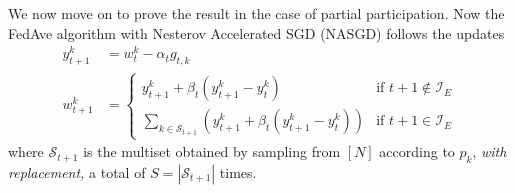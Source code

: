 %
We now move on to prove the result in the case of partial participation.
Now the FedAve algorithm with Nesterov Accelerated SGD (NASGD) follows
the updates
\begin{align*}
y_{t+1}^{k} & =w_{t}^{k}-\alpha_{t}g_{t,k}\\
w_{t+1}^{k} & =\begin{cases}
y_{t+1}^{k}+\beta_{t}(y_{t+1}^{k}-y_{t}^{k}) & \text{if }t+1\notin\mathcal{I}_{E}\\
\sum_{k\in\mathcal{S}_{t+1}}\left(y_{t+1}^{k}+\beta_{t}(y_{t+1}^{k}-y_{t}^{k})\right) & \text{if }t+1\in\mathcal{I}_{E}
\end{cases}
\end{align*}
where $\mathcal{S}_{t+1}$ is the multiset obtained by sampling from
$[N]$ according to $p_{k}$, \emph{with replacement, }a total of
$S=|\mathcal{S}_{t+1}|$ times. 

